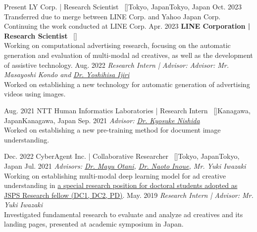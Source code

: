 
\begin{experiences}
    \researchexperience
    {Present}   {LY Corp. | Research Scientist{\normalfont  ~ [\href{https://www.lycorp.co.jp/en/}{\small{\websiteSymbol}}]}}{Tokyo, Japan}{Tokyo, Japan}
    {Oct. 2023} {
    Transferred due to merge between LINE Corp. and Yahoo Japan Corp. Continuing the work conducted at LINE Corp.
    \vskip 0.1cm
    }
    \researchexperience
    {}   {}{}{}
    {Apr. 2023} {\textbf{LINE Corporation | Research Scientist}{\normalfont  ~ [\href{https://linecorp.com/en/}{\small{\websiteSymbol}}]}\\
    Working on computational advertising research, focusing on the automatic generation and evaluation of multi-modal ad creatives, as well as the development of assistive technology.
    \vskip 0.1cm
    }
    \researchexperience
    {}   {}{}{}
    {Aug. 2022} {\textit{Research Intern | Advisor: {Advisor: Mr. Masayoshi Kondo and \href{https://scholar.google.co.jp/citations?user=VVoeVYIAAAAJ}{Dr. Yoshihisa Ijiri}}}\\
    Worked on establishing a new technology for automatic generation of advertising videos using images.
    }

    \emptySeparator
    \researchexperience
    {Aug. 2021}   {NTT Human Informatics Laboratories | Research Intern{\normalfont  ~ [\href{https://www.rd.ntt/e/hil/}{\small{\websiteSymbol}}]}}{Kanagawa, Japan}{Kanagawa, Japan}
    {Sep. 2021} {\textit{Advisor: \href{https://www.knishida.info/}{Dr. Kyosuke Nishida}}\\
    Worked on establishing a new pre-training method for document image understanding.
    }

    \emptySeparator
    \researchexperience
    {Dec. 2022}   {CyberAgent Inc. | Collaborative Researcher{\normalfont  ~ [\href{https://www.cyberagent.co.jp/news/detail/id=26231}{\small{\websiteSymbol}}]}}{Tokyo, Japan}{Tokyo, Japan}
    {Jul. 2021} {\textit{Advisors: \href{https://mayu-ot.github.io/}{Dr. Mayu Otani}, \href{https://naoto0804.github.io/}{Dr. Naoto Inoue}, {Mr. Yuki Iwazaki}}\\
    Working on establishing multi-modal deep learning model for ad creative understanding in \href{https://www.cyberagent.co.jp/news/detail/id=26231}{a special research position for doctoral students adopted as JSPS Research fellow (DC1, DC2, PD)}.
    \vskip 0.1cm
    }
    \researchexperience
    {}   {}{}{}
    {May. 2019} {\textit{Research Intern | Advisor: {Mr. Yuki Iwazaki}}\\
    Investigated fundamental research to evaluate and analyze ad creatives and its landing pages, presented at academic symposium in Japan.
    }


\end{experiences}
